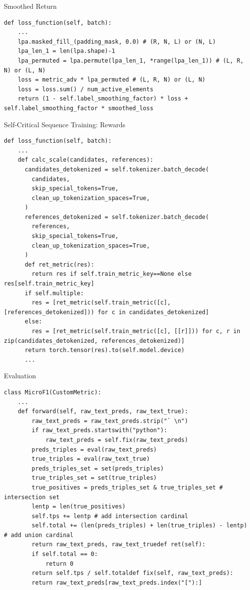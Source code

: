 \documentclass[aspectratio=169,xcolor=dvipsnames]{beamer}
\begin{document}
\begin{frame}[fragile]{Smoothed Return}
\begin{verbatim}
def loss_function(self, batch):
    ...
    lpa.masked_fill_(padding_mask, 0.0) # (R, N, L) or (N, L)
    lpa_len_1 = len(lpa.shape)-1
    lpa_permuted = lpa.permute(lpa_len_1, *range(lpa_len_1)) # (L, R, N) or (L, N)
    loss = metric_adv * lpa_permuted # (L, R, N) or (L, N)
    loss = loss.sum() / num_active_elements
    return (1 - self.label_smoothing_factor) * loss + self.label_smoothing_factor * smoothed_loss
\end{verbatim}
\end{frame}
\begin{frame}[fragile]{Self-Critical Sequence Training: Rewards}
\begin{verbatim}
def loss_function(self, batch):
    ...
    def calc_scale(candidates, references):
      candidates_detokenized = self.tokenizer.batch_decode(
        candidates,
        skip_special_tokens=True,
        clean_up_tokenization_spaces=True,
      )
      references_detokenized = self.tokenizer.batch_decode(
        references,
        skip_special_tokens=True,
        clean_up_tokenization_spaces=True,
      )
      def ret_metric(res):
        return res if self.train_metric_key==None else res[self.train_metric_key]
      if self.multiple:
        res = [ret_metric(self.train_metric([c], [references_detokenized])) for c in candidates_detokenized]
      else:
        res = [ret_metric(self.train_metric([c], [[r]])) for c, r in zip(candidates_detokenized, references_detokenized)]
      return torch.tensor(res).to(self.model.device)
      ...
\end{verbatim}
\end{frame}
\begin{frame}[fragile]{Evaluation}
\begin{verbatim}
class MicroF1(CustomMetric):
    ...
    def forward(self, raw_text_preds, raw_text_true):
        raw_text_preds = raw_text_preds.strip("` \n")
        if raw_text_preds.startswith("python"):
            raw_text_preds = self.fix(raw_text_preds)
        preds_triples = eval(raw_text_preds)
        true_triples = eval(raw_text_true)
        preds_triples_set = set(preds_triples)
        true_triples_set = set(true_triples)
        true_positives = preds_triples_set & true_triples_set # intersection set
        lentp = len(true_positives)
        self.tps += lentp # add intersection cardinal
        self.total += (len(preds_triples) + len(true_triples) - lentp) # add union cardinal
        return raw_text_preds, raw_text_truedef ret(self):
        if self.total == 0:
            return 0
        return self.tps / self.totaldef fix(self, raw_text_preds):
        return raw_text_preds[raw_text_preds.index("["):]
\end{verbatim}
\end{frame}
\end{document}
